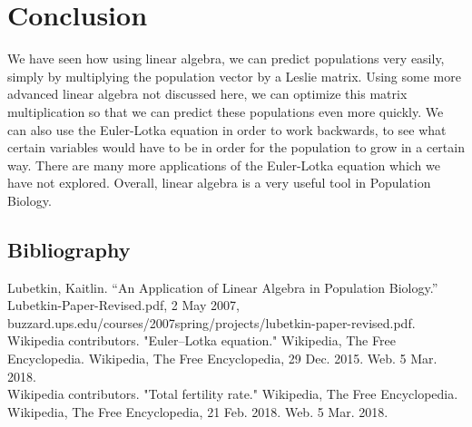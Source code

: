 \documentclass{article}
\begin{document}
\section{Conclusion}
We have seen how using linear algebra, we can predict populations very easily, simply by multiplying the population vector by a Leslie matrix. Using some more advanced linear algebra not discussed here, we can optimize this matrix multiplication so that we can predict these populations even more quickly. We can also use the Euler-Lotka equation in order to work backwards, to see what certain variables would have to be in order for the population to grow in a certain way. There are many more applications of the Euler-Lotka equation which we have not explored. Overall, linear algebra is a very useful tool in Population Biology.

\newpage
\subsection{Bibliography}
Lubetkin, Kaitlin. “An Application of Linear Algebra in Population Biology.” Lubetkin-Paper-Revised.pdf, 2 May 2007, buzzard.ups.edu/courses/2007spring/projects/lubetkin-paper-revised.pdf. \\
Wikipedia contributors. "Euler–Lotka equation." Wikipedia, The Free Encyclopedia. Wikipedia, The Free Encyclopedia, 29 Dec. 2015. Web. 5 Mar. 2018. \\
Wikipedia contributors. "Total fertility rate." Wikipedia, The Free Encyclopedia. Wikipedia, The Free Encyclopedia, 21 Feb. 2018. Web. 5 Mar. 2018.
\end{document}
